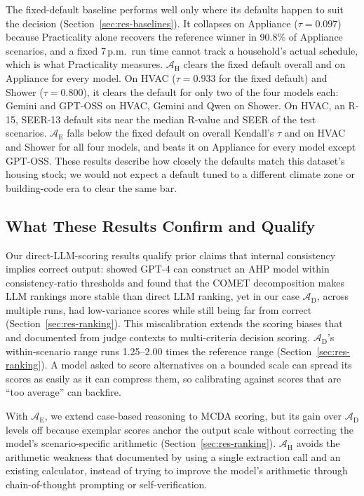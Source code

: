 \documentclass[final,3p,times]{elsarticle}
\begin{document}
The fixed-default baseline performs well only where its defaults happen to suit the decision (Section~\ref{sec:res-baselines}). It collapses on Appliance ($\tau = 0.097$) because Practicality alone recovers the reference winner in 90.8\% of Appliance scenarios, and a fixed 7\,p.m.\ run time cannot track a household's actual schedule, which is what Practicality measures. $\mathcal{A}_{\text{H}}$ clears the fixed default overall and on Appliance for every model. On HVAC ($\tau = 0.933$ for the fixed default) and Shower ($\tau = 0.800$), it clears the default for only two of the four models each: Gemini and GPT-OSS on HVAC, Gemini and Qwen on Shower. On HVAC, an R-15, SEER-13 default sits near the median R-value and SEER of the test scenarios. $\mathcal{A}_{\text{E}}$ falls below the fixed default on overall Kendall's $\tau$ and on HVAC and Shower for all four models, and beats it on Appliance for every model except GPT-OSS. These results describe how closely the defaults match this dataset's housing stock; we would not expect a default tuned to a different climate zone or building-code era to clear the same bar.

\FloatBarrier
\subsection{What These Results Confirm and Qualify}
\label{sec:comparison}

Our direct-LLM-scoring results qualify prior claims that internal consistency implies correct output: \citet{svoboda2024} showed GPT-4 can construct an AHP model within consistency-ratio thresholds and \citet{icaart26} found that the COMET decomposition makes LLM rankings more stable than direct LLM ranking, yet in our case $\mathcal{A}_{\text{D}}$, across multiple runs, had low-variance scores while still being far from correct (Section~\ref{sec:res-ranking}). This miscalibration extends the scoring biases that \citet{wang2024fairescalers} and \citet{li2026scoringbias} documented from judge contexts to multi-criteria decision scoring. $\mathcal{A}_{\text{D}}$'s within-scenario range runs 1.25--2.00 times the reference range (Section~\ref{sec:res-ranking}). A model asked to score alternatives on a bounded scale can spread its scores as easily as it can compress them, so calibrating against scores that are ``too average'' can backfire.

With $\mathcal{A}_{\text{E}}$, we extend case-based reasoning \cite{aamodtplaza1994,minorkaucher2024} to MCDA scoring, but its gain over $\mathcal{A}_{\text{D}}$ levels off because exemplar scores anchor the output scale without correcting the model's scenario-specific arithmetic (Section~\ref{sec:res-ranking}). $\mathcal{A}_{\text{H}}$ avoids the arithmetic weakness that \citet{imani2023mathprompter} documented by using a single extraction call and an existing calculator, instead of trying to improve the model's arithmetic through chain-of-thought prompting \cite{wei2022cot} or self-verification.
\end{document}
